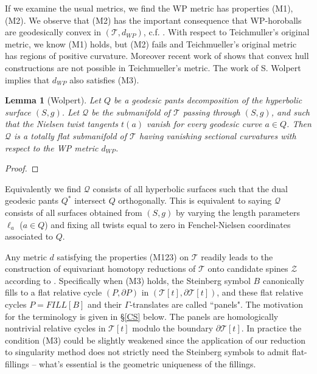 \documentclass[12pt]{amsart}
\newtheorem{lem}[thm]{Lemma}
\theoremstyle{definition}
\theoremstyle{remark}
\newcommand{\del}{\partial}
\newcommand{\sT}{\mathscr{T}}
\newcommand{\sZ}{\mathscr{Z}}
\begin{document}
If we examine the usual metrics, we find the WP metric has properties (M1), (M2). We observe that (M2) has the important consequence that WP-horoballs are geodesically convex in $(\sT, d_{WP})$, c.f. \cite{GroCurv}. With respect to Teichmuller's original metric, we know (M1) holds, but (M2) fails and Teichmueller's original metric has regions of positive curvature. Moreover recent work of \cite{RafiBourque} shows that convex hull constructions are not possible in Teichmueller's metric. The work of S. Wolpert implies that $d_{WP}$ also satisfies (M3). 


\begin{lem}[Wolpert]
Let $Q$ be a geodesic pants decomposition of the hyperbolic surface $(S,g)$. Let $\mathscr{Q}$ be the submanifold of $\sT$ passing through $(S,g)$, and such that the Nielsen twist tangents $t(a)$ vanish for every geodesic curve $a \in Q$. Then $\mathscr{Q}$ is a totally flat submanifold of $\sT$ having vanishing sectional curvatures with respect to the WP metric $d_{WP}$. 
\end{lem}
\begin{proof}

\end{proof}

Equivalently we find $\mathscr{Q}$ consists of all hyperbolic surfaces such that the dual geodesic pants $Q^*$ intersect $Q$ orthogonally. This is equivalent to saying $\mathscr{Q}$ consists of all surfaces obtained from $(S,g)$ by varying the length parameters $\ell_a$ ($a\in Q$) and fixing all twists equal to zero in Fenchel-Nielsen coordinates associated to $Q$. 


Any metric $d$ satisfying the properties (M123) on $\sT$ readily leads to the construction of equivariant homotopy reductions of $\sT$ onto candidate spines $\sZ$ according to \cite{martel}. Specifically when (M3) holds, the Steinberg symbol $B$ canonically fills to a flat relative cycle $(P, \del P)$ in $(\sT[t], \del \sT[t])$, and these flat relative cycles $P=FILL[B]$ and their $\Gamma$-translates are called ``panels". The motivation for the terminology is given in \S \ref{CS} below. The panels are homologically nontrivial relative cycles in $\sT[t]$ modulo the boundary $\del \sT[t]$. In practice the condition (M3) could be slightly weakened since the application of our reduction to singularity method \cite{martel} does not strictly need the Steinberg symbols to admit flat-fillings -- what's essential is the geometric uniqueness of the fillings.
\end{document}
